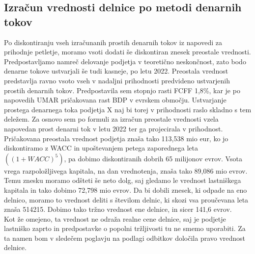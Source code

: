 \documentclass[12pt,a4paper]{amsart}
\theoremstyle{definition} %
\theoremstyle{plain} %
\begin{document}
\subsection{Izračun vrednosti delnice po metodi denarnih tokov}
Po diskontiranju vseh izračunanih prostih denarnih tokov iz napovedi za prihodnje petletje, moramo vsoti dodati še diskontiran znesek preostale vrednosti. Predpostavljamo namreč delovanje podjetja v teoretično neskončnost, zato bodo denarne tokove ustvarjali še tudi kasneje, po letu 2022. Preostala vrednost predstavlja ravno vsoto vseh v nadaljni prihodnosti predvideno ustvarjenih prostih denarnih tokov. Predpostavila sem stopnjo rasti FCFF 1,8\%, kar je po napovedih UMAR pričakovana rast BDP v evrskem območju. Ustvarjanje prostega denarnega toka podjetja X naj bi torej v prihodnosti raslo skladno s tem deležem. Za osnovo sem po formuli za izračun preostale vrednosti vzela napovedan prost denarni tok v letu 2022 ter ga projecirala v prihodnost. Pričakovana preostala vrednost podjetja znaša tako 113,538 mio eur, ko jo diskontiramo z WACC in upoštevanjem petega zaporednega leta $((1+WACC)^5)$, pa dobimo diskontiranih dobrih 65 milijonov evrov. Vsota vrega razpoložljivega kapitala, na dan vrednotenja, znaša tako 89,086 mio evrov. Temu znesku moramo odšteti še neto dolg, saj gledamo le vrednost lastniškega kapitala in tako dobimo 72,798 mio evrov. Da bi dobili znesek, ki odpade na eno delnico, moramo to vrednost deliti s številom delnic, ki skozi vsa proučevana leta znaša 514215. Dobimo tako tržno vrednost ene delnice, in sicer 141,6 evrov. \\
Kot že omejeno, ta vrednost ne odraža realne cene delnice, saj je podjetje lastniško zaprto in predpostavke o popolni tržljivosti tu ne smemo uporabiti. Za ta namen bom v sledečem poglavju na podlagi odbitkov določila pravo vrednost delnice.
\end{document}
